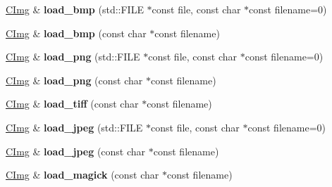 \begin{DoxyCompactItemize}
\item 
\hypertarget{structcimg__library_1_1_c_img_a9d9eab2fca0c2ac1c0dd22ef114a5f8e}{\hyperlink{structcimg__library_1_1_c_img}{C\-Img} \& {\bfseries load\-\_\-bmp} (std\-::\-F\-I\-L\-E $\ast$const file, const char $\ast$const filename=0)}\label{structcimg__library_1_1_c_img_a9d9eab2fca0c2ac1c0dd22ef114a5f8e}

\item 
\hypertarget{structcimg__library_1_1_c_img_a1ddb0c4a55723922e866f971e5c87dd9}{\hyperlink{structcimg__library_1_1_c_img}{C\-Img} \& {\bfseries load\-\_\-bmp} (const char $\ast$const filename)}\label{structcimg__library_1_1_c_img_a1ddb0c4a55723922e866f971e5c87dd9}

\item 
\hypertarget{structcimg__library_1_1_c_img_a88eae066c138394b1659b051ce5e0aaa}{\hyperlink{structcimg__library_1_1_c_img}{C\-Img} \& {\bfseries load\-\_\-png} (std\-::\-F\-I\-L\-E $\ast$const file, const char $\ast$const filename=0)}\label{structcimg__library_1_1_c_img_a88eae066c138394b1659b051ce5e0aaa}

\item 
\hypertarget{structcimg__library_1_1_c_img_aeb0ba1f9a9049f4444ac63e118fb2c0f}{\hyperlink{structcimg__library_1_1_c_img}{C\-Img} \& {\bfseries load\-\_\-png} (const char $\ast$const filename)}\label{structcimg__library_1_1_c_img_aeb0ba1f9a9049f4444ac63e118fb2c0f}

\item 
\hypertarget{structcimg__library_1_1_c_img_a40ba0c2da622edd20d4925d97c923cf4}{\hyperlink{structcimg__library_1_1_c_img}{C\-Img} \& {\bfseries load\-\_\-tiff} (const char $\ast$const filename)}\label{structcimg__library_1_1_c_img_a40ba0c2da622edd20d4925d97c923cf4}

\item 
\hypertarget{structcimg__library_1_1_c_img_a3532440be1bc9e5d560a8a4bc5bb8b98}{\hyperlink{structcimg__library_1_1_c_img}{C\-Img} \& {\bfseries load\-\_\-jpeg} (std\-::\-F\-I\-L\-E $\ast$const file, const char $\ast$const filename=0)}\label{structcimg__library_1_1_c_img_a3532440be1bc9e5d560a8a4bc5bb8b98}

\item 
\hypertarget{structcimg__library_1_1_c_img_aace8a1932b7d3ad6216f1dbf23a310f9}{\hyperlink{structcimg__library_1_1_c_img}{C\-Img} \& {\bfseries load\-\_\-jpeg} (const char $\ast$const filename)}\label{structcimg__library_1_1_c_img_aace8a1932b7d3ad6216f1dbf23a310f9}

\item 
\hypertarget{structcimg__library_1_1_c_img_ad0b95dce78785d8bdd436eaf482356d0}{\hyperlink{structcimg__library_1_1_c_img}{C\-Img} \& {\bfseries load\-\_\-magick} (const char $\ast$const filename)}\label{structcimg__library_1_1_c_img_ad0b95dce78785d8bdd436eaf482356d0}


\end{DoxyCompactItemize}
